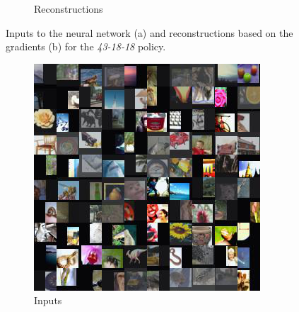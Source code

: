 \begin{figure}[hbt!]
\begin{subfigure}{.49\linewidth}
\caption{Reconstructions}%
\end{subfigure}%
\caption{Inputs to the neural network (a) and reconstructions based on the gradients (b) for the \textit{43-18-18} policy.}
    \label{fig:apprr}
\end{figure}


\begin{figure}[hbt!]
\begin{subfigure}{.49\linewidth}\centering
\includegraphics[width=\textwidth]{grids/data_cifar100_arch_ResNet20-4_epoch_200_optim_inversed_mode_aug_auglist_3-1-7+43-18-18_rlabel_False_reaugment_translate_clipped3_ORIGINALS.png}
\caption{Inputs}%
\end{subfigure}%
\hfill
\begin{subfigure}{.49\linewidth}\centering

\end{subfigure}
\end{figure}
